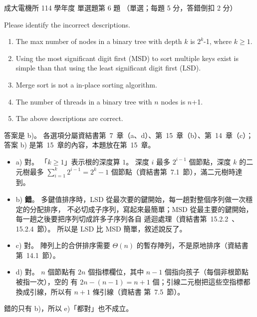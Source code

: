\begin{pastexam}[label={px:ncku-114-ee-ds-06}]{成大電機所 114 學年度 單選題第 6 題}
（單選；每題 5 分，答錯倒扣 2 分）

Please identify the incorrect descriptions.
\begin{enumerate}[label=\alph*)]
\item The max number of nodes in a binary tree with depth $k$ is $2^k$-1, where $k\ge 1$.
\item Using the most significant digit first (MSD) to sort multiple keys exist is simple than that
using the least significant digit first (LSD).
\item Merge sort is not a in-place sorting algorithm.
\item The number of threads in a binary tree with $n$ nodes is $n$+1.
\item The above descriptions are correct.
\end{enumerate}
\end{pastexam}

\begin{pastsoln}
答案是 b)。 各選項分屬資結書第~7~章（a、d）、第~15~章（b）、第~14~章（c）；答案 b) 是第~15~章的內容，本題放在第~15~章。

\begin{itemize}
\item a) 對。 「$k \ge 1$」表示根的深度算 $1$。 深度 $i$ 最多 $2^{i-1}$ 個節點，深度 $k$ 的二元樹最多
$\sum_{i=1}^{k} 2^{i-1} = 2^k - 1$ 個節點（資結書第~7.1~節），滿二元樹時達到。
\item b) \textbf{錯}。 多鍵值排序時，LSD 從最次要的鍵開始，每一趟對整個序列做一次穩定的分配排序，
不必切成子序列，寫起來最簡單；MSD 從最主要的鍵開始，每一趟之後要把序列切成許多子序列各自
遞迴處理（資結書第~15.2.2~、15.2.4~節）。 所以是 LSD 比 MSD 簡單，敘述說反了。
\item c) 對。 陣列上的合併排序需要 $\Theta(n)$ 的暫存陣列，不是原地排序（資結書第~14.1~節）。
\item d) 對。 $n$ 個節點有 $2n$ 個指標欄位，其中 $n - 1$ 個指向孩子（每個非根節點被指一次），空的
有 $2n - (n - 1) = n + 1$ 個；引線二元樹把這些空指標都換成引線，所以有 $n + 1$ 條引線（資結書
第~7.5~節）。
\end{itemize}
錯的只有 b)，所以 e)「都對」也不成立。
\end{pastsoln}

